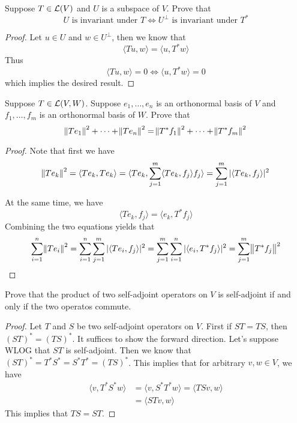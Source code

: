 \documentclass{extarticle}
\begin{document}
\begin{problem}{4}
    Suppose \(T \in \mathcal{L}(V)\) and \(U\) is a subspace of \(V\). Prove that 
    \[U \text{ is invariant under } T \Longleftrightarrow U^\perp \text{ is invariant under }T^*\]
\end{problem}

\begin{proof}
Let \(u \in U\) and \(w \in U^\perp\), then we know that 
\[\langle Tu,w \rangle = \langle u,T^*w \rangle\]
Thus 
\[\langle Tu,w \rangle = 0 \Longleftrightarrow \langle u,T^*w \rangle = 0\]
which implies the desired result.
\end{proof}


\begin{problem}{5}
    Suppose \(T \in \mathcal{L}(V, W)\). Suppose \(e_1, \ldots, e_n\) is an orthonormal basis of \(V\) and 
    \(f_1, \ldots, f_m\) is an orthonormal basis of \(W\). Prove that 
    \[\norm{T e_1}^2 + \cdots + \norm{T e_n}^2 = \norm{T^* f_1 }^2 + \cdots + \norm{T^* f_m}^2\]
\end{problem}

\begin{proof}
Note that first we have 
\[\norm{T e_k}^2 = \langle T e_k, T e_k \rangle 
= \langle Te_k, \sum_{j=1}^{m} \langle T e_k, f_j \rangle f_j \rangle 
= \sum_{j=1}^{m} |\langle T e_k, f_j \rangle|^2\]

At the same time, we have 
\[ \langle Te_k, f_j \rangle = \langle e_k, T^* f_j \rangle\]
Combining the two equations yields that 
\begin{align*}
    \sum_{i=1}^{n} \norm{T e_i}^2  
    = \sum_{i=1}^{n} \sum_{j=1}^{m} |\langle T e_i,f_j \rangle|^2  
    = \sum_{j=1}^{m} \sum_{i=1}^{n} |\langle e_i,T^* f_j \rangle|^2 
    = \sum_{j=1}^{m} \norm{T^* f_j}^2
\end{align*}
\end{proof}


\begin{problem}{9}
    Prove that the product of two self-adjoint operators on \(V\) is self-adjoint if and only if the 
    two operatos commute.
\end{problem}

\begin{proof}
Let \(T\) and \(S\) be two self-adjoint operators on \(V\). First if \(ST = TS\), then \((ST)^* 
= (TS)^*\). It suffices to show the forward direction. Let's suppose WLOG that \(ST\) is self-adjoint. 
Then we know that \((ST)^* = T^* S^* = S^* T^* = (TS)^*\). This implies that for arbitrary 
\(v, w \in V\), we have 
\begin{align*}
    \langle v,T^* S^* w \rangle 
    &= \langle v, S^* T^* w \rangle = \langle TSv,w \rangle \\ 
    &= \langle STv,w \rangle
\end{align*}
This implies that \(TS = ST\).
\end{proof}
\end{document}
